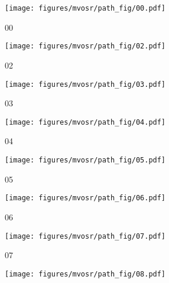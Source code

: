 \begin{figure}
    \centering
    \begin{subfigure}[b]{0.18\textwidth}
    \texttt{[image: figures/mvosr/path\_fig/00.pdf]}

    \caption{00}
    \vspace*{2mm}

    \label{fig:orb_path_00}
    \end{subfigure}
    \begin{subfigure}[b]{0.18\textwidth}
        \texttt{[image: figures/mvosr/path\_fig/02.pdf]}

        \caption{02}
        \label{fig:orb_path_02}
        \vspace*{2mm}
     \end{subfigure}
    \begin{subfigure}[b]{0.18\textwidth}
            \texttt{[image: figures/mvosr/path\_fig/03.pdf]}

        \caption{03}
        \label{fig:orb_path_03}
        \vspace*{2mm}
    \end{subfigure}
    \begin{subfigure}[b]{0.18\textwidth}
        \texttt{[image: figures/mvosr/path\_fig/04.pdf]}

    \caption{04}
    \label{fig:orb_path_04}
    \vspace*{2mm}
    \end{subfigure}
    \begin{subfigure}[b]{0.18\textwidth}
        \texttt{[image: figures/mvosr/path\_fig/05.pdf]}

    \caption{05}
    \label{fig:orb_path_05}
    \vspace*{2mm}
    \end{subfigure}
    \begin{subfigure}[b]{0.18\textwidth}
        \texttt{[image: figures/mvosr/path\_fig/06.pdf]}

    \caption{06}
    \label{fig:orb_path_06}
    \vspace*{2mm}
    \end{subfigure}
    \begin{subfigure}[b]{0.18\textwidth}
        \texttt{[image: figures/mvosr/path\_fig/07.pdf]}

    \caption{07}
    \label{fig:orb_path_07}
    \vspace*{2mm}
    \end{subfigure}
    \begin{subfigure}[b]{0.18\textwidth}
        \texttt{[image: figures/mvosr/path\_fig/08.pdf]}


\end{subfigure}
\end{figure}
